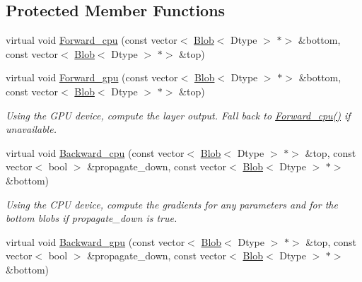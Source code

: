 \subsection*{Protected Member Functions}
\begin{DoxyCompactItemize}
\item 
virtual void \mbox{\hyperlink{classcaffe_1_1_scale_layer_a517d8eb2816c79daa1454ef5c7de065b}{Forward\+\_\+cpu}} (const vector$<$ \mbox{\hyperlink{classcaffe_1_1_blob}{Blob}}$<$ Dtype $>$ $\ast$$>$ \&bottom, const vector$<$ \mbox{\hyperlink{classcaffe_1_1_blob}{Blob}}$<$ Dtype $>$ $\ast$$>$ \&top)
\item 
\mbox{\label{classcaffe_1_1_scale_layer_abff4005ecb550f54dc86f163ca9f26db}} 
virtual void \mbox{\hyperlink{classcaffe_1_1_scale_layer_abff4005ecb550f54dc86f163ca9f26db}{Forward\+\_\+gpu}} (const vector$<$ \mbox{\hyperlink{classcaffe_1_1_blob}{Blob}}$<$ Dtype $>$ $\ast$$>$ \&bottom, const vector$<$ \mbox{\hyperlink{classcaffe_1_1_blob}{Blob}}$<$ Dtype $>$ $\ast$$>$ \&top)
\begin{DoxyCompactList}\small\item\em Using the G\+PU device, compute the layer output. Fall back to \mbox{\hyperlink{classcaffe_1_1_scale_layer_a517d8eb2816c79daa1454ef5c7de065b}{Forward\+\_\+cpu()}} if unavailable. \end{DoxyCompactList}\item 
\mbox{\label{classcaffe_1_1_scale_layer_a4b41188afeb445da06721fdf80526cf0}} 
virtual void \mbox{\hyperlink{classcaffe_1_1_scale_layer_a4b41188afeb445da06721fdf80526cf0}{Backward\+\_\+cpu}} (const vector$<$ \mbox{\hyperlink{classcaffe_1_1_blob}{Blob}}$<$ Dtype $>$ $\ast$$>$ \&top, const vector$<$ bool $>$ \&propagate\+\_\+down, const vector$<$ \mbox{\hyperlink{classcaffe_1_1_blob}{Blob}}$<$ Dtype $>$ $\ast$$>$ \&bottom)
\begin{DoxyCompactList}\small\item\em Using the C\+PU device, compute the gradients for any parameters and for the bottom blobs if propagate\+\_\+down is true. \end{DoxyCompactList}\item 
\mbox{\label{classcaffe_1_1_scale_layer_aa0a2e96ec16cc61a2d8a9d47b729bee4}} 
virtual void \mbox{\hyperlink{classcaffe_1_1_scale_layer_aa0a2e96ec16cc61a2d8a9d47b729bee4}{Backward\+\_\+gpu}} (const vector$<$ \mbox{\hyperlink{classcaffe_1_1_blob}{Blob}}$<$ Dtype $>$ $\ast$$>$ \&top, const vector$<$ bool $>$ \&propagate\+\_\+down, const vector$<$ \mbox{\hyperlink{classcaffe_1_1_blob}{Blob}}$<$ Dtype $>$ $\ast$$>$ \&bottom)

\end{DoxyCompactItemize}
